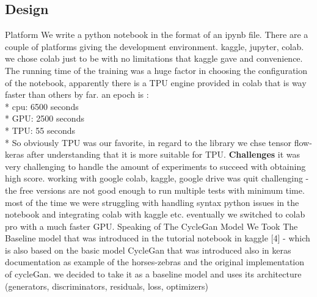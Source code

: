 \documentclass{article}
\begin{document}
    \subsection{Design}
    Platform
    We write a python notebook in the format of an ipynb file. There are a couple of platforms giving the development environment. kaggle, jupyter, colab. we chose colab just to be with no limitations that kaggle gave and convenience.
    The running time of the training was a huge factor in choosing the configuration of the notebook, apparently there is a TPU engine provided in colab that is way faster than others by far.
    an epoch is :\\*
    cpu: 6500 seconds\\*
    GPU: 2500 seconds\\*
    TPU: 55 seconds\\*
    So obviously TPU was our favorite, in regard to the library we chse tensor flow-keras after understanding that it is more suitable for TPU.
    \textbf{Challenges}
    it was very challenging to handle the amount of experiments to succeed with obtaining high score.
    working with google colab, kaggle, google drive was quit challenging - the free versions are not good enough to run multiple tests with minimum time. most of the time we were struggling with handling syntax python issues in the notebook and integrating colab with kaggle etc.
    eventually we switched to colab pro with a much faster GPU.
    Speaking of The CycleGan Model We Took The Baseline model that was introduced in the tutorial notebook in kaggle [4] - which is also based on the basic model CycleGan that was introduced also in keras documentation as example of the horses-zebras and the original implementation of cycleGan. we decided to take it as a baseline model and uses its architecture (generators, discriminators, residuals, loss, optimizers)
\end{document}

